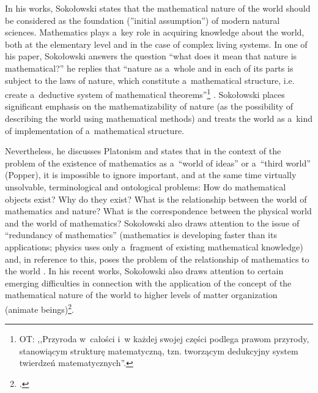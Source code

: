 In his works, Sokołowski states that the mathematical nature of the world should be considered as the foundation (''initial assumption'') of modern natural sciences. Mathematics plays a~key role in acquiring knowledge about the world, both at the elementary level and in the case of complex living systems. In one of his paper, Sokołowski answers the question ``what does it mean that nature is mathematical?'' he replies that ``nature as a~whole and in each of its parts is subject to the laws of nature, which constitute a~mathematical structure, i.e. create a~deductive system of mathematical theorems''\footnote{OT: ,,Przyroda w~całości i~w każdej swojej części podlega prawom przyrody, stanowiącym strukturę matematyczną, tzn. tworzącym dedukcyjny system twierdzeń matematycznych''.} 
\parencite[][]{}. %
 Sokołowski places significant emphasis on the mathematizability of nature (as the possibility of describing the world using mathematical methods) and treats the world as a~kind of implementation of a~mathematical structure.



Nevertheless, he discusses Platonism and states that in the context of the problem of the existence of mathematics as a~``world of ideas'' or a~``third world'' (Popper), it is impossible to ignore important, and at the same time virtually unsolvable, terminological and ontological problems: How do mathematical objects exist? Why do they exist? What is the relationship between the world of mathematics and nature? What is the correspondence between the physical world and the world of mathematics? Sokołowski also draws attention to the issue of ``redundancy of mathematics'' (mathematics is developing faster than its applications; physics uses only a~fragment of existing mathematical knowledge) and, in reference to this, poses the problem of the relationship of mathematics to the world 
\parencite[][pp.217–220]{}. %
 In his recent works, Sokołowski also draws attention to certain emerging difficulties in connection with the application of the concept of the mathematical nature of the world to higher levels of matter organization (animate beings)\footnote{
\parencite[][p.74]{}.%
}.



